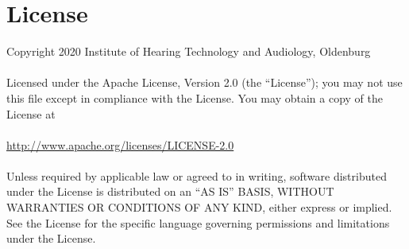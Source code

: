 \documentclass[11pt,a4paper,titlepage]{article}
\newcommand{\Institute}{Institute of Hearing Technology and Audiology, Oldenburg}
\begin{document}
\clearpage


\section{License}

 Copyright 2020 \Institute\\
\\
   Licensed under the Apache License, Version 2.0 (the ``License'');
   you may not use this file except in compliance with the License.
   You may obtain a copy of the License at\\
\\
	 \url{http://www.apache.org/licenses/LICENSE-2.0}\\
\\
   Unless required by applicable law or agreed to in writing, software
   distributed under the License is distributed on an ``AS IS'' BASIS,
   WITHOUT WARRANTIES OR CONDITIONS OF ANY KIND, either express or implied.
   See the License for the specific language governing permissions and
   limitations under the License.
\end{document}
